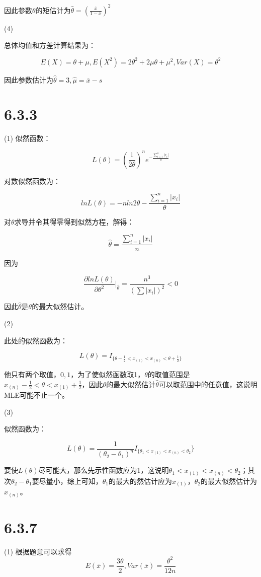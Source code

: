 \documentclass{article}
\begin{document}
因此参数$\theta$的矩估计为$\hat \theta=(\frac{\overline x}{1-\overline x})^2$

(4)

总体均值和方差计算结果为：

$$E(X)=\theta+\mu,E(X^2)=2\theta^2+2\mu\theta+\mu^2,Var(X)=\theta^2$$

因此参数估计为$\hat\theta=3,\hat\mu=\overline x-s$

\section{6.3.3}

(1)
似然函数：

$$L(\theta)=(\frac{1}{2\theta})^n e^{-\frac{\sum_{i=1}^n|x_i|}{\theta}}$$

对数似然函数为：

$$ln L(\theta)=-nln2\theta-\frac{\sum^n_{i=1}|x_i|}{\theta}$$

对$\theta$求导并令其得零得到似然方程，解得：

$$\hat \theta = \frac{\sum^n_{i=1}|x_i|}{n}$$

因为

$$\frac{\partial lnL(\theta)}{\partial \theta^2}|_{\hat\theta}=\frac{n^3}{(\sum|x_i|)^2}<0$$

因此$\hat \theta $是$\theta$的最大似然估计。

(2)

此处的似然函数为：

$$L(\theta)=I_{\{\theta-\frac12<x_{(1)}<x_{(n)}<\theta+\frac12\}}$$

他只有两个取值，$0,1$，为了使似然函数取1，$\theta$的取值范围是$x_{(n)}-\frac12<\theta<x_{(1)}+\frac12$，因此$\theta$的最大似然估计$\hat \theta$可以取范围中的任意值，这说明MLE可能不止一个。

(3)

似然函数为：

$$L(\theta)=\frac1{(\theta_2-\theta_1)^n}I_{\{\theta_1<x_{(1)}<x_{(n)}<\theta_2}\}$$

要使$L(\theta)$尽可能大，那么先示性函数应为1，这说明$\theta_1<x_{(1)}<x_{(n)}<\theta_2$；其次$\theta_2-\theta_1$要尽量小，综上可知，$\theta_1$的最大的然估计应为$x_{(1)}$，$\theta_2$的最大似然估计为$x_{(n)}$。




\section{6.3.7}
(1)
根据题意可以求得
$$E(\overline x)=\frac{3\theta}{2},Var(\overline x)=\frac{\theta^2}{12n}
$$
\end{document}
